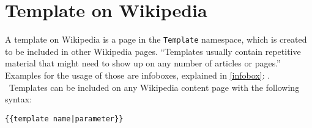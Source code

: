 \section{Template on Wikipedia}

A template on Wikipedia is a page in the \texttt{\justify Template} namespace, which is created to be included in other Wikipedia pages. ``Templates usually contain repetitive material that might need to show up on any number of articles or pages.'' \citep{wiki:21} Examples for the usage of those are infoboxes, explained in \ref{infobox}: . \\\
Templates can be included on any Wikipedia content page with the following syntax:
\begin{lstlisting}[frame=single] 
{{template name|parameter}}
\end{lstlisting}